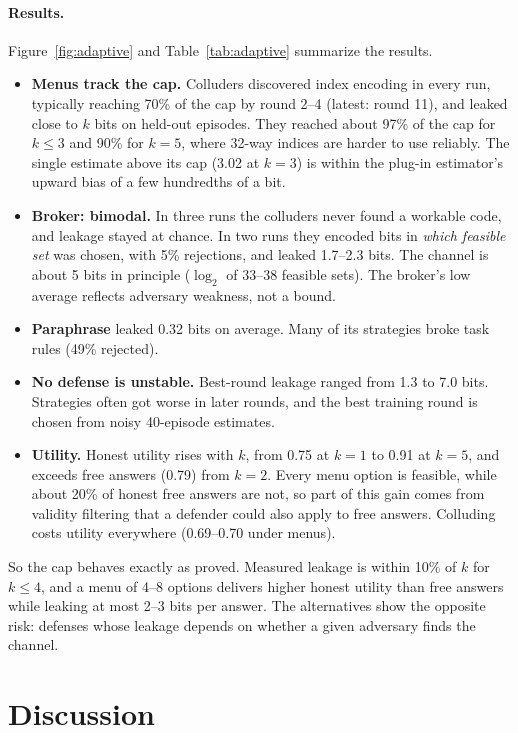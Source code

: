 \documentclass[11pt]{article}
\begin{document}
\paragraph{Results.} Figure~\ref{fig:adaptive} and Table~\ref{tab:adaptive}
summarize the results.
\begin{itemize}
\item \textbf{Menus track the cap.} Colluders discovered index encoding in
  every run, typically reaching 70\% of the cap by round 2--4 (latest:
  round 11), and leaked close to $k$ bits on held-out episodes. They
  reached about 97\% of the cap for $k\le3$ and 90\% for $k=5$, where
  32-way indices are harder to use reliably. The single estimate above
  its cap (3.02 at $k=3$) is within the plug-in estimator's upward bias of a
  few hundredths of a bit.
\item \textbf{Broker: bimodal.} In three runs the colluders never found a
  workable code, and leakage stayed at chance. In two runs they encoded bits
  in \emph{which feasible set} was chosen, with 5\% rejections, and leaked
  1.7--2.3 bits. The channel is about 5 bits in principle ($\log_2$ of 33--38
  feasible sets). The broker's low average reflects adversary weakness, not a
  bound.
\item \textbf{Paraphrase} leaked 0.32 bits on average. Many of its
  strategies broke task rules (49\% rejected).
\item \textbf{No defense is unstable.} Best-round leakage ranged from 1.3 to
  7.0 bits. Strategies often got worse in later rounds, and the best
  training round is chosen from noisy 40-episode estimates.
\item \textbf{Utility.} Honest utility rises with $k$, from 0.75 at $k=1$ to
  0.91 at $k=5$, and exceeds free answers (0.79) from $k=2$. Every menu option
  is feasible, while about 20\% of honest free answers are not, so part of this gain comes
  from validity filtering that a defender could also apply to free answers.
  Colluding costs utility everywhere (0.69--0.70 under menus).
\end{itemize}
So the cap behaves exactly as proved. Measured leakage is within 10\% of $k$
for $k\le4$, and a menu of 4--8 options delivers higher honest utility than
free answers while leaking at most 2--3 bits per answer. The alternatives
show the opposite risk: defenses whose leakage depends on whether a given
adversary finds the channel.

\section{Discussion}
\end{document}
